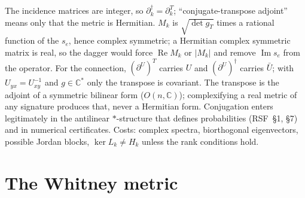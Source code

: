 \documentclass[11pt]{article}
\theoremstyle{definition}
\theoremstyle{plain}
\theoremstyle{remark}
\newcommand{\C}{\mathbb{C}}
\newcommand{\Gram}{g}
\newcommand{\bd}{\partial}
\newcommand{\Tr}{^{T}}
\begin{document}
The incidence matrices are integer, so \(\bd_k^{\dagger}=\bd_k\Tr\); ``conjugate-transpose adjoint'' means only that the metric is Hermitian. \(M_k\) is \(\sqrt{\det\Gram_T}\) times a rational function of the \(s_e\), hence complex symmetric; a Hermitian complex symmetric matrix is real, so the dagger would force \(\operatorname{Re}M_k\) or \(|M_k|\) and remove \(\operatorname{Im}s_e\) from the operator. For the connection, \((\bd^{U})\Tr\) carries \(U\) and \((\bd^{U})^{\dagger}\) carries \(\bar U\); with \(U_{yx}=U_{xy}^{-1}\) and \(g\in\C^{*}\) only the transpose is covariant. The transpose is the adjoint of a symmetric bilinear form (\(O(n,\C)\)); complexifying a real metric of any signature produces that, never a Hermitian form. Conjugation enters legitimately in the antilinear \(*\)-structure that defines probabilities (RSF~\S1, \S7) and in numerical certificates. Costs: complex spectra, biorthogonal eigenvectors, possible Jordan blocks, \(\ker L_k\ne H_k\) unless the rank conditions hold.

\section{The Whitney metric}\label{sec:metric}
\end{document}
